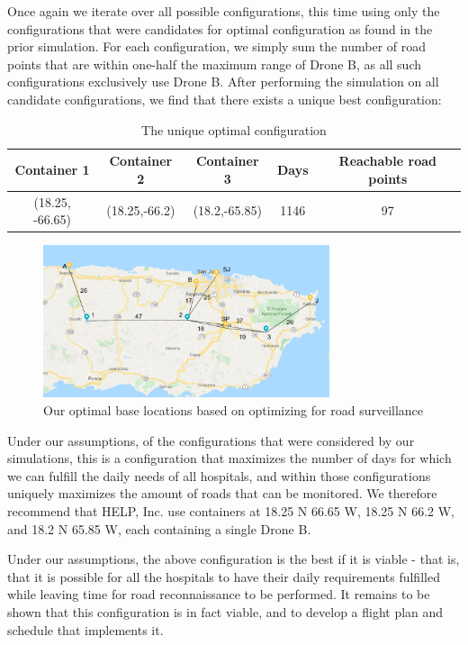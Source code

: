 Once again we iterate over all possible configurations, this time using only the configurations that were candidates for optimal configuration as found in the prior simulation. For each configuration, we simply sum the number of road points that are within one-half the maximum range of Drone B, as all such configurations exclusively use Drone B. 
After performing the simulation on all candidate configurations, we find that there exists a unique best configuration:
\begin{table}[h]
    \centering
    \begin{tabular}{c|c|c||c|c}
    \hline Container 1 & Container 2 & Container 3 & Days  & Reachable road points\\
    \hline
    (18.25, -66.65) & (18.25,-66.2) & (18.2,-65.85) & 1146 & 97\\
    \end{tabular}
    \caption{The unique optimal configuration}
    \label{tab:best_config}
\end{table}

\begin{figure}[h]
    \centering
    \includegraphics[width=0.75\textwidth]{2_5.png}
    \caption{Our optimal base locations based on optimizing for road surveillance}
    \label{fig:2_5_map}
\end{figure}

Under our assumptions, of the configurations that were considered by our simulations, this is a configuration that maximizes the number of days for which we can fulfill the daily needs of all hospitals, and within those configurations uniquely maximizes the amount of roads that can be monitored. We therefore recommend that HELP, Inc. use containers at 18.25 N 66.65 W, 18.25 N 66.2 W, and 18.2 N 65.85 W, each containing a single Drone B.   

Under our assumptions, the above configuration is the best if it is viable - that is, that it is possible for all the hospitals to have their daily requirements fulfilled while leaving time for road reconnaissance to be performed. It remains to be shown that this configuration is in fact viable, and to develop a flight plan and schedule that implements it.  


